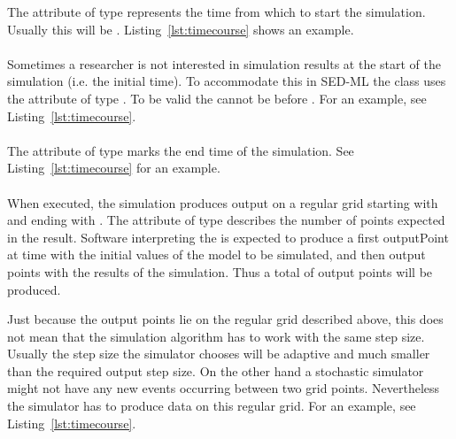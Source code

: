 The attribute  of type  represents the time from which to start the simulation. Usually this will be . Listing~\ref{lst:timecourse} shows an example. 

\paragraph{}

\label{sec:outputStartTime}

Sometimes a researcher is not interested in simulation results at the start of the simulation (i.e. the initial time). To accommodate this in SED-ML the  class uses the  attribute  of type . To be valid the  cannot be before .  For an example, see Listing~\ref{lst:timecourse}. 

\paragraph{}
\label{sec:outputEndTime}

The attribute  of type  marks the end time of the simulation. See Listing~\ref{lst:timecourse} for an example. 

\paragraph{}
\label{sec:numberOfPoints}

When executed, the  simulation produces output on a regular grid starting with  and ending with . The attribute   of type  describes the number of points expected in the result. Software interpreting the  is expected to produce a first outputPoint at time  with the initial values of the model to be simulated, and then  output points with the results of the simulation. Thus a total of  output points will be produced.

Just because the output points lie on the regular grid described above, this does not mean that the simulation algorithm has to work with the same step size. Usually the step size the simulator chooses will be adaptive and much smaller than the required output step size. On the other hand a stochastic simulator might not have any new events occurring between two grid points. Nevertheless the simulator has to produce data on this regular grid. For an example, see Listing~\ref{lst:timecourse}. 



